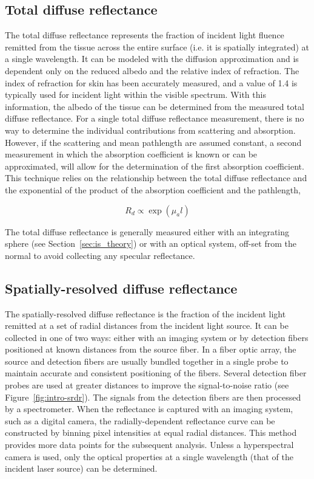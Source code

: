\subsection{Total diffuse reflectance}
\label{sec:total_diff_refl}
The total diffuse reflectance represents the fraction of incident light fluence remitted from the tissue across the entire surface (i.e. it is spatially integrated) at a single wavelength. It can be modeled with the diffusion approximation and is dependent only on the reduced albedo and the relative index of refraction.\cite{Kim2011} The index of refraction for skin has been accurately measured, and a value of 1.4 is typically used for incident light within the visible spectrum.\cite{Kienle1996a} With this information, the albedo of the tissue can be determined from the measured total diffuse reflectance. For a single total diffuse reflectance measurement, there is no way to determine the individual contributions from scattering and absorption. However, if the scattering and mean pathlength are assumed constant, a second measurement in which the absorption coefficient is known or can be approximated, will allow for the determination of the first absorption coefficient. This technique relies on the relationship between the total diffuse reflectance and the exponential of the product of the absorption coefficient and the pathlength,

\begin{equation}
	R_d\propto\exp\left(\mu_al\right)
\end{equation}

 \noindent The total diffuse reflectance is generally measured either with an integrating sphere (see Section~\ref{sec:is_theory}) or with an optical system, off-set from the normal to avoid collecting any specular reflectance.

\subsection{Spatially-resolved diffuse reflectance}
\label{sec:spat_diff_refl}
The spatially-resolved diffuse reflectance is the fraction of the incident light remitted at a set of radial distances from the incident light source. It can be collected in one of two ways: either with an imaging system\cite{Kienle1996b} or by detection fibers positioned at known distances from the source fiber.\cite{Kim2011} In a fiber optic array, the source and detection fibers are usually bundled together in a single probe to maintain accurate and consistent positioning of the fibers. Several detection fiber probes are used at greater distances to improve the signal-to-noise ratio (see Figure~\ref{fig:intro-srdr}). The signals from the detection fibers are then processed by a spectrometer. When the reflectance is captured with an imaging system, such as a digital camera, the radially-dependent reflectance curve can be constructed by binning pixel intensities at equal radial distances. This method provides more data points for the subsequent analysis. Unless a hyperspectral camera is used, only the optical properties at a single wavelength (that of the incident laser source) can be determined.

